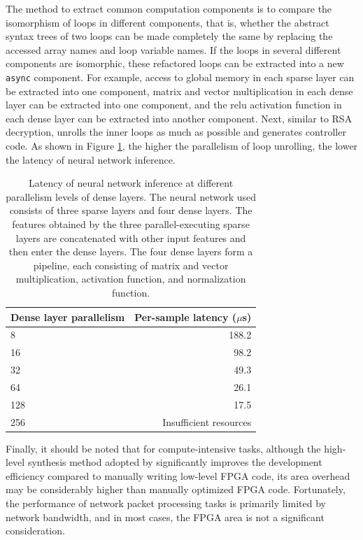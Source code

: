 The method to extract common computation components is to compare the isomorphism of loops in different components, that is, whether the abstract syntax trees of two loops can be made completely the same by replacing the accessed array names and loop variable names. If the loops in several different components are isomorphic, these refactored loops can be extracted into a new \texttt{async} component. For example, access to global memory in each sparse layer can be extracted into one component, matrix and vector multiplication in each dense layer can be extracted into one component, and the relu activation function in each dense layer can be extracted into another component. Next, similar to RSA decryption, \name unrolls the inner loops as much as possible and generates controller code. As shown in Figure \ref{clicknp:tab:neural-network}, the higher the parallelism of loop unrolling, the lower the latency of neural network inference.

\begin{table}[htbp]
	\centering
	\caption{Latency of neural network inference at different parallelism levels of dense layers. The neural network used consists of three sparse layers and four dense layers. The features obtained by the three parallel-executing sparse layers are concatenated with other input features and then enter the dense layers. The four dense layers form a pipeline, each consisting of matrix and vector multiplication, activation function, and normalization function.}
	\label{clicknp:tab:neural-network}
	\small
	\begin{tabular}{l|r}
		\toprule
		Dense layer parallelism & Per-sample latency ($\mu$s) \\
		\midrule
		8 & 188.2 \\
		16 & 98.2 \\
		32 & 49.3 \\
		64 & 26.1 \\
		128 & 17.5 \\
		256 & Insufficient resources \\
		\bottomrule
	\end{tabular}
\end{table}

Finally, it should be noted that for compute-intensive tasks, although the high-level synthesis method adopted by \name significantly improves the development efficiency compared to manually writing low-level FPGA code, its area overhead may be considerably higher than manually optimized FPGA code. Fortunately, the performance of network packet processing tasks is primarily limited by network bandwidth, and in most cases, the FPGA area is not a significant consideration.

